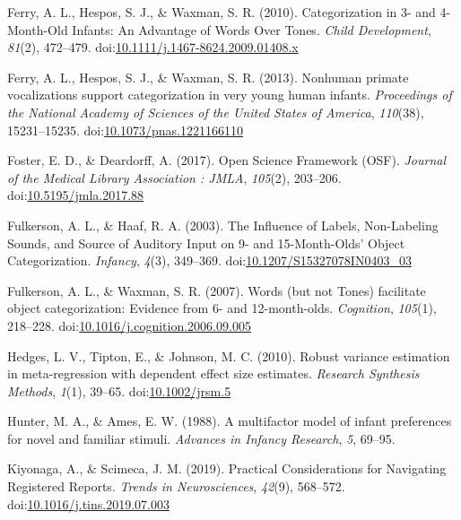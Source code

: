 \documentclass[man]{apa6}
\begin{document}
\hypertarget{ref-ferry_categorization_2010}{}
Ferry, A. L., Hespos, S. J., \& Waxman, S. R. (2010). Categorization in
3- and 4-Month-Old Infants: An Advantage of Words Over Tones.
\emph{Child Development}, \emph{81}(2), 472--479.
doi:\href{https://doi.org/10.1111/j.1467-8624.2009.01408.x}{10.1111/j.1467-8624.2009.01408.x}

\hypertarget{ref-ferry_nonhuman_2013}{}
Ferry, A. L., Hespos, S. J., \& Waxman, S. R. (2013). Nonhuman primate
vocalizations support categorization in very young human infants.
\emph{Proceedings of the National Academy of Sciences of the United
States of America}, \emph{110}(38), 15231--15235.
doi:\href{https://doi.org/10.1073/pnas.1221166110}{10.1073/pnas.1221166110}

\hypertarget{ref-foster_open_2017}{}
Foster, E. D., \& Deardorff, A. (2017). Open Science Framework (OSF).
\emph{Journal of the Medical Library Association : JMLA}, \emph{105}(2),
203--206.
doi:\href{https://doi.org/10.5195/jmla.2017.88}{10.5195/jmla.2017.88}

\hypertarget{ref-fulkerson_influence_2003}{}
Fulkerson, A. L., \& Haaf, R. A. (2003). The Influence of Labels,
Non-Labeling Sounds, and Source of Auditory Input on 9- and
15-Month-Olds' Object Categorization. \emph{Infancy}, \emph{4}(3),
349--369.
doi:\href{https://doi.org/10.1207/S15327078IN0403_03}{10.1207/S15327078IN0403\_03}

\hypertarget{ref-fulkerson_words_2007}{}
Fulkerson, A. L., \& Waxman, S. R. (2007). Words (but not Tones)
facilitate object categorization: Evidence from 6- and 12-month-olds.
\emph{Cognition}, \emph{105}(1), 218--228.
doi:\href{https://doi.org/10.1016/j.cognition.2006.09.005}{10.1016/j.cognition.2006.09.005}

\hypertarget{ref-hedges_robust_2010}{}
Hedges, L. V., Tipton, E., \& Johnson, M. C. (2010). Robust variance
estimation in meta-regression with dependent effect size estimates.
\emph{Research Synthesis Methods}, \emph{1}(1), 39--65.
doi:\href{https://doi.org/10.1002/jrsm.5}{10.1002/jrsm.5}

\hypertarget{ref-hunter_multifactor_1988}{}
Hunter, M. A., \& Ames, E. W. (1988). A multifactor model of infant
preferences for novel and familiar stimuli. \emph{Advances in Infancy
Research}, \emph{5}, 69--95.

\hypertarget{ref-kiyonaga_practical_2019}{}
Kiyonaga, A., \& Scimeca, J. M. (2019). Practical Considerations for
Navigating Registered Reports. \emph{Trends in Neurosciences},
\emph{42}(9), 568--572.
doi:\href{https://doi.org/10.1016/j.tins.2019.07.003}{10.1016/j.tins.2019.07.003}
\end{document}
